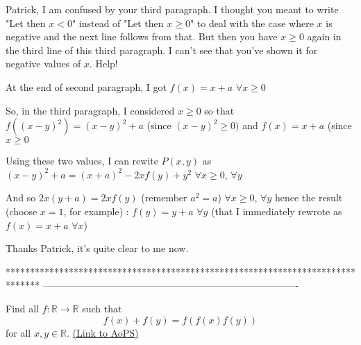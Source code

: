 \begin{solution}
	\begin{tcolorbox}Patrick, I am confused by your third paragraph. I thought you meant to write "Let then $ x < 0$" instead of "Let then $ x\ge0$" to deal with the case where $ x$ is negative and the next line follows from that. But then you have $ x\ge0$ again in the third line of this third paragraph. I can't see that you've shown it for negative values of $ x$. Help!\end{tcolorbox}

At the end of second paragraph, I got $ f(x) = x + a$ $ \forall x\ge 0$

So, in the third paragraph, I considered $ x\ge 0$ so that $ f((x - y)^2) = (x - y)^2 + a$ (since $ (x - y)^2\ge 0)$ and $ f(x) = x + a$ (since $ x\ge 0$

Using these two values, I can rewite $ P(x,y)$ as $ (x - y)^2 + a = (x + a)^2 - 2xf(y) + y^2$ $ \forall x\ge 0$, $ \forall y$

And so $ 2x(y + a) = 2xf(y)$ (remember $ a^2 = a$)  $ \forall x\ge 0$, $ \forall y$ hence the result (choose $ x = 1$, for example) : $ f(y) = y + a$ $ \forall y$ (that I immediately rewrote as $ f(x)=x+a$ $ \forall x$)
\end{solution}



\begin{solution}
	Thanks Patrick, it's quite clear to me now.
\end{solution}
*******************************************************************************
-------------------------------------------------------------------------------

\begin{problem}
	Find all $ f: \mathbb R\to\mathbb R$ such that \[f(x)+f(y)=f(f(x)f(y))\] for all $x,y\in\mathbb R$.
	\flushright \href{https://artofproblemsolving.com/community/c6h316340}{(Link to AoPS)}
\end{problem}



